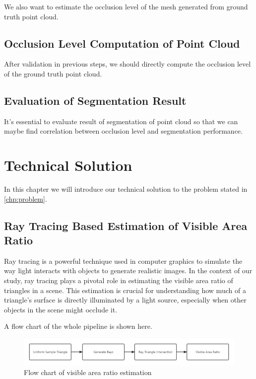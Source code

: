 \documentclass[11pt, a4paper,oneside,chapterprefix=false]{scrbook}
\begin{document}
We also want to estimate the occlusion level of the mesh generated from ground truth point cloud.

\section{Occlusion Level Computation of Point Cloud} \label{sec:occlusion}

After validation in previous steps, we should directly compute the occlusion level of the ground truth point cloud.

\section{Evaluation of Segmentation Result} \label{sec:evaluation}

It's essential to evaluate result of segmentation of point cloud so that we can maybe find correlation between occlusion level and segmentation performance.

\chapter{Technical Solution} \label{chp:solution}

In this chapter we will introduce our technical solution to the problem stated in \ref{chp:problem}.

\section{Ray Tracing Based Estimation of Visible Area Ratio} \label{sec:ray tracing visible area ratio}

Ray tracing is a powerful technique used in computer graphics to simulate the way light interacts with objects to generate realistic images. In the context of our study, ray tracing plays a pivotal role in estimating the visible area ratio of triangles in a scene. This estimation is crucial for understanding how much of a triangle's surface is directly illuminated by a light source, especially when other objects in the scene might occlude it.

A flow chart of the whole pipeline is shown here.

\begin{minipage}{\textwidth}
	\begin{figure}[H]
		\centering
		\includegraphics*[width=1.0\textwidth]{figures/visible area.png}
		\caption{Flow chart of visible area ratio estimation}
		\label{fig:visible area ratio estimation}
	\end{figure}
\end{minipage}
\end{document}

